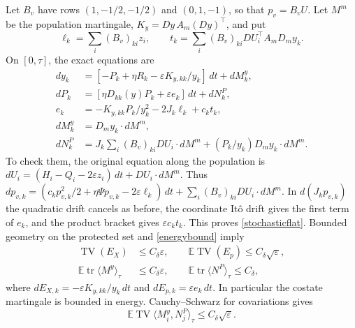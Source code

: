 \documentclass[11pt,a4paper]{article}
\newcommand{\E}{\mathbb E}
\newcommand{\tr}{\operatorname{tr}}
\newcommand{\TV}{\operatorname{TV}}
\newcommand{\dt}{\,dt}
\begin{document}
Let $B_v$ have rows
$(1,-1/2,-1/2)$ and $(0,1,-1)$, so that $p_v=B_vU$.
Let $M^m$ be the population martingale,
$K_y=Dy\,A_m(Dy)^\top$, and put
\[
 \ell_k=\sum_i(B_v)_{ki}z_i,\qquad
 t_k=\sum_i(B_v)_{ki}DU_i^\top A_mD_my_k.
\]
On $[0,\tau]$, the exact equations are
\begin{equation}\label{stochasticflat}
 \begin{split}
 dy_k&=[-P_k+\eta R_k-\varepsilon K_{y,kk}/y_k]\dt+dM_k^y,\\
 dP_k&=[\eta D_{kk}(y)P_k+\varepsilon e_k]\dt+dN_k^P,\\
 e_k&=-K_{y,kk}P_k/y_k^2-2J_k\ell_k+c_kt_k,\\
 dM_k^y&=D_my_k\cdot dM^m,\\
 dN_k^P&=J_k\sum_i(B_v)_{ki}DU_i\cdot dM^m
                    +(P_k/y_k)D_my_k\cdot dM^m.
 \end{split}
\end{equation}
To check them, the original equation along the population is
$dU_i=(H_i-Q_i-2\varepsilon z_i)\dt+DU_i\cdot dM^m$.
Thus
$dp_{v,k}=(c_kp_{v,k}^2/2+\eta\Psi p_{v,k}
-2\varepsilon\ell_k)\dt+\sum_i(B_v)_{ki}DU_i\cdot dM^m$.
In $d(J_kp_{v,k})$ the quadratic drift cancels as before, the
coordinate It\^o drift gives the first term of $e_k$, and the product
bracket gives $\varepsilon c_kt_k$. This proves
\eqref{stochasticflat}.
Bounded geometry on the protected set and \eqref{energybound} imply
\begin{equation}\label{noisebounds}
 \begin{split}
 \TV(E_X)&\leq C_\delta\varepsilon,\qquad
 \E\TV(E_p)\leq C_\delta\sqrt\varepsilon,\\
 \E\tr\langle M^y\rangle_\tau&\leq C_\delta\varepsilon,\qquad
 \E\tr\langle N^P\rangle_\tau\leq C_\delta,
 \end{split}
\end{equation}
where $dE_{X,k}=-\varepsilon K_{y,kk}/y_k\dt$ and
$dE_{p,k}=\varepsilon e_k\dt$.
In particular the costate martingale is bounded in energy.
Cauchy--Schwarz for covariations gives
\begin{equation}\label{crossnoise}
 \E\TV\langle M_i^y,N_j^P\rangle_\tau
       \leq C_\delta\sqrt\varepsilon.
\end{equation}
\end{document}
